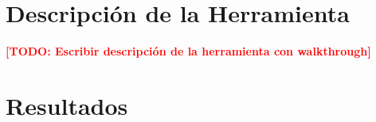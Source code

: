 \documentclass[12pt, letterpaper, oneside]{article}
\newcommand{\TODO}[1]{\textcolor{red}{\textbf{[TODO: #1]}}}
\begin{document}
\section{Descripción de la Herramienta}
\label{sec:descripcion-herramienta}


\TODO{Escribir descripción de la herramienta con walkthrough}


\section{Resultados}
\label{sec:resultados}

\end{document}
